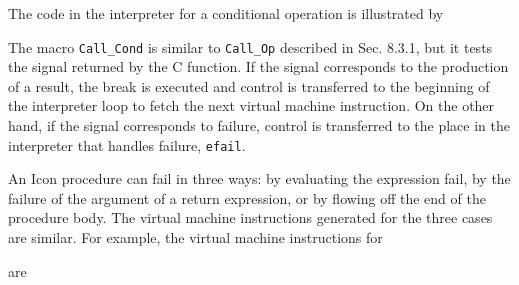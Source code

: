 The code in the interpreter for a conditional operation is illustrated by

\goodbreak
{}

The macro \texttt{Call\_Cond} is similar to \texttt{Call\_Op}
described in Sec. 8.3.1, but it tests the signal returned by the C
function. If the signal corresponds to the production of a result, the
break is executed and control is transferred to the beginning of the
interpreter loop to fetch the next virtual machine instruction. On the
other hand, if the signal corresponds to failure, control is
transferred to the place in the interpreter that handles failure,
\texttt{efail}.


An Icon procedure can fail in three ways: by evaluating the expression
fail, by the failure of the argument of a return expression, or by
flowing off the end of the procedure body. The virtual machine
instructions generated for the three cases are similar. For example,
the virtual machine instructions for


are

\goodbreak
{}

